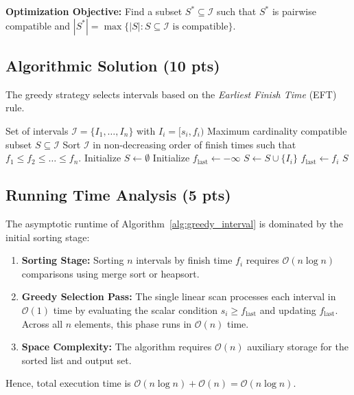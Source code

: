 \textbf{Optimization Objective:} Find a subset $S^* \subseteq \mathcal{I}$ such that $S^*$ is pairwise compatible and $|S^*| = \max \{ |S| : S \subseteq \mathcal{I} \text{ is compatible} \}$.

\subsection{Algorithmic Solution (10 pts)}
The greedy strategy selects intervals based on the \textit{Earliest Finish Time} (EFT) rule.

\begin{algorithm}[H]
\caption{Optimal Interval Scheduling (Greedy EFT)}
\label{alg:greedy_interval}
\begin{algorithmic}[1]
\REQUIRE Set of intervals $\mathcal{I} = \{I_1, \dots, I_n\}$ with $I_i = [s_i, f_i)$
\ENSURE Maximum cardinality compatible subset $S \subseteq \mathcal{I}$
\STATE Sort $\mathcal{I}$ in non-decreasing order of finish times such that $f_1 \le f_2 \le \dots \le f_n$.
\STATE Initialize $S \leftarrow \emptyset$
\STATE Initialize $f_{\text{last}} \leftarrow -\infty$
        \STATE $S \leftarrow S \cup \{I_i\}$
        \STATE $f_{\text{last}} \leftarrow f_i$
    \ENDIF
\ENDFOR
\RETURN $S$
\end{algorithmic}
\end{algorithm}

\subsection{Running Time Analysis (5 pts)}
The asymptotic runtime of Algorithm~\ref{alg:greedy_interval} is dominated by the initial sorting stage:
\begin{enumerate}
    \item \textbf{Sorting Stage:} Sorting $n$ intervals by finish time $f_i$ requires $\mathcal{O}(n \log n)$ comparisons using merge sort or heapsort.
    \item \textbf{Greedy Selection Pass:} The single linear scan processes each interval in $\mathcal{O}(1)$ time by evaluating the scalar condition $s_i \ge f_{\text{last}}$ and updating $f_{\text{last}}$. Across all $n$ elements, this phase runs in $\mathcal{O}(n)$ time.
    \item \textbf{Space Complexity:} The algorithm requires $\mathcal{O}(n)$ auxiliary storage for the sorted list and output set.
\end{enumerate}
Hence, total execution time is $\mathcal{O}(n \log n) + \mathcal{O}(n) = \mathcal{O}(n \log n)$.


